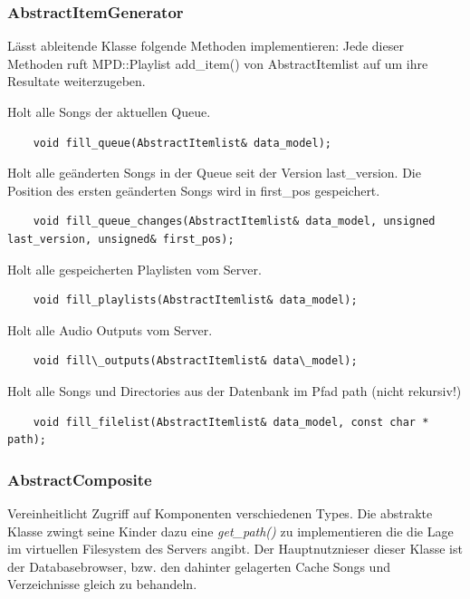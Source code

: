 
\subsubsection{AbstractItemGenerator}
Lässt ableitende Klasse folgende Methoden implementieren:
Jede dieser Methoden ruft MPD::Playlist add\_item() von AbstractItemlist auf um ihre Resultate weiterzugeben.

Holt alle Songs der aktuellen Queue.
\begin{verbatim}            
    void fill_queue(AbstractItemlist& data_model);
\end{verbatim}

Holt alle geänderten Songs in der Queue seit der Version last\_version. Die Position des ersten geänderten Songs wird in first\_pos gespeichert. 
\begin{verbatim}
    void fill_queue_changes(AbstractItemlist& data_model, unsigned last_version, unsigned& first_pos);
\end{verbatim}

Holt alle gespeicherten Playlisten vom Server.
\begin{verbatim}              
    void fill_playlists(AbstractItemlist& data_model);
\end{verbatim}

Holt alle Audio Outputs vom Server.
\begin{verbatim}
    void fill\_outputs(AbstractItemlist& data\_model);
\end{verbatim}

Holt alle Songs und Directories aus der Datenbank im Pfad path (nicht rekursiv!)              
\begin{verbatim}
    void fill_filelist(AbstractItemlist& data_model, const char * path);
\end{verbatim}



\subsubsection{AbstractComposite}
Vereinheitlicht Zugriff auf Komponenten verschiedenen Types.
Die abstrakte Klasse zwingt seine Kinder dazu eine \emph{get\_path()} zu implementieren die die Lage im virtuellen Filesystem des Servers angibt.
Der Hauptnutznieser dieser Klasse ist der Databasebrowser, bzw. den dahinter gelagerten Cache Songs und Verzeichnisse gleich zu behandeln.

